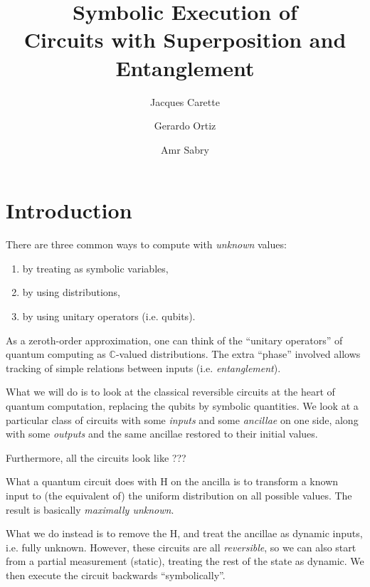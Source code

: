 \documentclass[sigplan]{acmart}
\newcommand{\Cplx}{\ensuremath{\mathbb{C}}}
\begin{document}
\title{Symbolic Execution of \\
  Circuits with Superposition and Entanglement}

\author{Jacques Carette}

\author{Gerardo Ortiz}

\author{Amr Sabry}

\maketitle

\section{Introduction}

There are three common ways to compute with \emph{unknown} values:
\begin{enumerate}
  \item by treating as symbolic variables,
  \item by using distributions,
  \item by using unitary operators (i.e. qubits).
\end{enumerate}
As a zeroth-order approximation, one can think of the ``unitary operators'' of quantum
computing as \Cplx-valued distributions. The extra ``phase'' involved allows tracking of
simple relations between inputs (i.e. \emph{entanglement}).

What we will do is to look at the classical reversible circuits at the heart
of quantum computation, replacing the qubits by symbolic quantities. We look at a particular
class of circuits with some \emph{inputs} and some \emph{ancillae} on one side, along
with some \emph{outputs} and the same ancillae restored to their initial values.

Furthermore, all the circuits look like ???

What a quantum circuit does with H on the ancilla is to transform a known input to
(the equivalent of) the uniform distribution on all possible values. The result is
basically \emph{maximally unknown}.

What we do instead is to remove the H, and treat the ancillae as dynamic inputs, i.e.
fully unknown. However, these circuits are all \emph{reversible}, so we can also 
start from a partial measurement (static), treating the rest of the state as dynamic.
We then execute the circuit backwards ``symbolically''.
\end{document}
